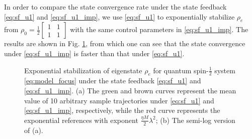 \documentclass[]{elsarticle}
\begin{document}
In order to compare the state convergence rate under the state feedback \eqref{eq:sf_u1} and \eqref{eq:sf_u1_imp}, we use \eqref{eq:sf_u1} to exponentially stabilize $\rho_{e}$ from $\rho_0=\frac{1}{2}\left[\begin{array}{cc}
	1 & 1 \\
	1 & 1
\end{array}\right]$ with the same control parameters in \eqref{eq:sf_u1_imp}. The results are shown in Fig. \ref{figur:numerical_results_2}, from which one can see that the state convergence under  \eqref{eq:sf_u1_imp} is faster than that under \eqref{eq:sf_u1}. {}
\begin{figure}[!htbp]
	\centering
	\hfil
	\caption{Exponential stabilization of eigenstate $\rho_{e}$ for quantum spin-$\frac{1}{2}$ system \eqref{eq:model_focus} under the state feedback \eqref{eq:sf_u1} and \eqref{eq:sf_u1_imp}. (a) The green and brown curves represent the mean value of 10 arbitrary sample trajectories under \eqref{eq:sf_u1} and \eqref{eq:sf_u1_imp}, respectively, while the red curve represents the exponential references with exponent $\frac{{\eta M}}{2}\lambda^{2}$; (b)  The semi-log version of (a).}
	\label{figur:numerical_results_2}
\end{figure}
\end{document}
